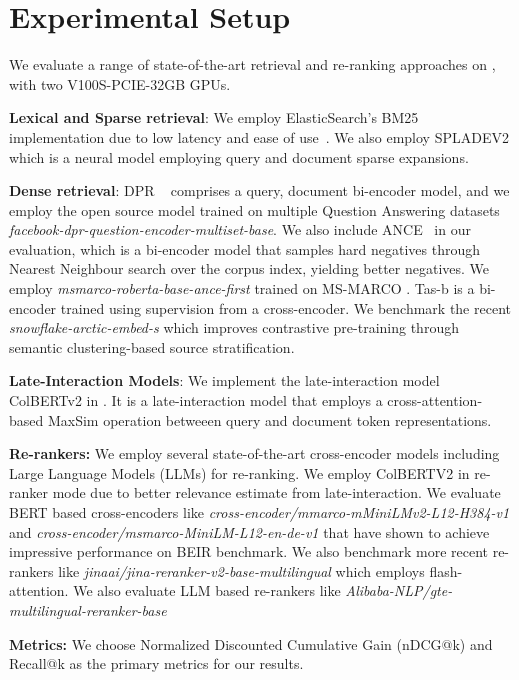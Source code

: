 

\vspace{-0.7em}
\section{Experimental Setup}
 We evaluate a range of state-of-the-art retrieval and re-ranking approaches on \name{},  with two V100S-PCIE-32GB GPUs. 

\textbf{Lexical and Sparse retrieval}: We employ ElasticSearch's BM25 implementation due to low latency and ease of use~\cite{fogelberg2023search}. We also employ SPLADEV2 \cite{SPLADEv2} which is a neural model employing query and document sparse expansions.

\textbf{Dense retrieval}: DPR ~\cite{karpukhin-etal-2020-dense} comprises a query, document bi-encoder model, and we employ the open source model trained on multiple Question Answering datasets \textit{facebook-dpr-question-encoder-multiset-base}. We also include ANCE~\cite{ance} in our evaluation, which is a bi-encoder model that samples hard negatives through Nearest Neighbour search over the corpus index, yielding better negatives. We employ \textit{msmarco-roberta-base-ance-first} trained on MS-MARCO \cite{bajaj2018ms}. Tas-b \cite{tas-b} is a bi-encoder trained using supervision from a cross-encoder. We benchmark the recent \textit{snowflake-arctic-embed-s} \cite{merrick2024embeddingclusteringdataimprove} which improves contrastive pre-training through semantic clustering-based source stratification. 

\textbf{Late-Interaction Models}: We implement the late-interaction model ColBERTv2 \cite{colbert,santhanam-etal-2022-colbertv2} in \name{}. It is a late-interaction model that employs a cross-attention-based MaxSim operation betweeen query and document token representations.

\textbf{Re-rankers:} We employ several state-of-the-art cross-encoder models including Large Language Models (LLMs) for re-ranking. We employ ColBERTV2 in re-ranker mode due to better relevance estimate from late-interaction. We evaluate BERT based cross-encoders like \textit{cross-encoder/mmarco-mMiniLMv2-L12-H384-v1} and \textit{cross-encoder/msmarco-MiniLM-L12-en-de-v1} that have shown to achieve impressive performance on BEIR \cite{beir} benchmark. We also benchmark more recent re-rankers like \textit{jinaai/jina-reranker-v2-base-multilingual} which employs flash-attention. We also evaluate LLM based re-rankers like \textit{Alibaba-NLP/gte-multilingual-reranker-base}

\textbf{Metrics:}  We choose Normalized Discounted Cumulative Gain (nDCG@k) and Recall@k as the primary metrics for our results. 
\vspace{-1.2em}

